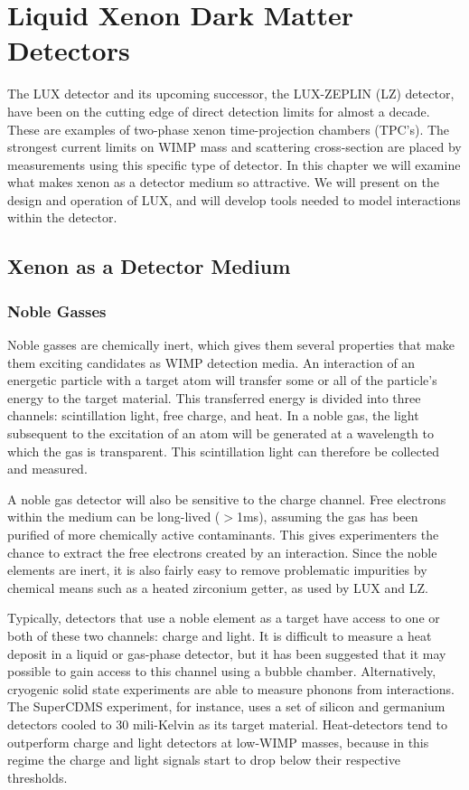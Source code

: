 \chapter{Liquid Xenon Dark Matter Detectors}\label{chap:2}
The LUX detector and its upcoming successor, the LUX-ZEPLIN (LZ) detector, have been on the cutting edge of direct detection limits for almost a decade. These are examples of two-phase xenon time-projection chambers (TPC's). The strongest current limits on WIMP mass and scattering cross-section are placed by measurements using this specific type of detector. In this chapter we will examine what makes xenon as a detector medium so attractive. We will present on the design and operation of LUX, and will develop tools needed to model interactions within the detector.

\section{Xenon as a Detector Medium}
\subsection{Noble Gasses}
Noble gasses are chemically inert, which gives them several properties that make them exciting candidates as WIMP detection media. An interaction of an energetic particle with a target atom will transfer some or all of the particle's energy to the target material. This transferred energy is divided into three channels: scintillation light, free charge, and heat. In a noble gas, the light subsequent to the excitation of an atom will be generated at a wavelength to which the gas is transparent. This scintillation light can therefore be collected and measured.

A noble gas detector will also be sensitive to the charge channel. Free electrons within the medium can be long-lived ($>$1ms), assuming the gas has been purified of more chemically active contaminants. This gives experimenters the chance to extract the free electrons created by an interaction. Since the noble elements are inert, it is also fairly easy to remove problematic impurities by chemical means such as a heated zirconium getter, as used by LUX and LZ.

Typically, detectors that use a noble element as a target have access to one or both of these two channels: charge and light. It is difficult to measure a heat deposit in a liquid or gas-phase detector, but it has been suggested that it may possible to gain access to this channel using a bubble chamber\cite{bubble}. Alternatively, cryogenic solid state experiments are able to measure phonons from interactions. The SuperCDMS experiment, for instance, uses a set of silicon and germanium detectors cooled to 30 mili-Kelvin as its target material\cite{cdms}. Heat-detectors tend to outperform charge and light detectors at low-WIMP masses, because in this regime the charge and light signals start to drop below their respective thresholds.

